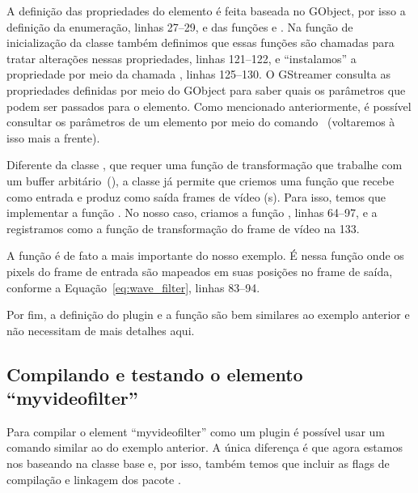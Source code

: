 A definição das propriedades do elemento é feita baseada no 
GObject, por isso a definição da enumeração, linhas 27--29, e das funções
 e .  Na
função de inicialização da classe  também
definimos que essas funções são chamadas para tratar alterações nessas
propriedades, linhas 121--122, e ``instalamos'' a propriedade por meio da
chamada , linhas 125--130.  O GStreamer consulta
as propriedades definidas por meio do GObject para saber quais os parâmetros
que podem ser passados para o elemento.  Como mencionado anteriormente, é
possível consultar os parâmetros de um elemento por meio do comando
~(voltaremos à isso mais a frente).

Diferente da classe , que requer uma função de transformação que
trabalhe com um buffer arbitário~(), a classe 
já permite que criemos uma função que recebe como entrada e produz como saída
frames de vídeo (s).  Para isso, temos que implementar a
função .  No nosso caso, criamos a função
, linhas 64--97, e a registramos como a função
de transformação do frame de vídeo na 133.

A função  é de fato a mais importante do nosso exemplo.
É nessa função onde os pixels do frame de entrada são mapeados em suas posições
no frame de saída, conforme a Equação~\ref{eq:wave_filter}, linhas 83--94.

Por fim, a definição do plugin e a função  são bem
similares ao exemplo anterior e não necessitam de mais detalhes aqui.

\subsection*{Compilando e testando o elemento ``myvideofilter''}
Para compilar o element ``myvideofilter'' como um plugin é possível usar um
comando similar ao do exemplo anterior.  A única diferença é que agora estamos
nos baseando na classe base  e, por isso, também temos que
incluir as flags de compilação e linkagem dos pacote .

